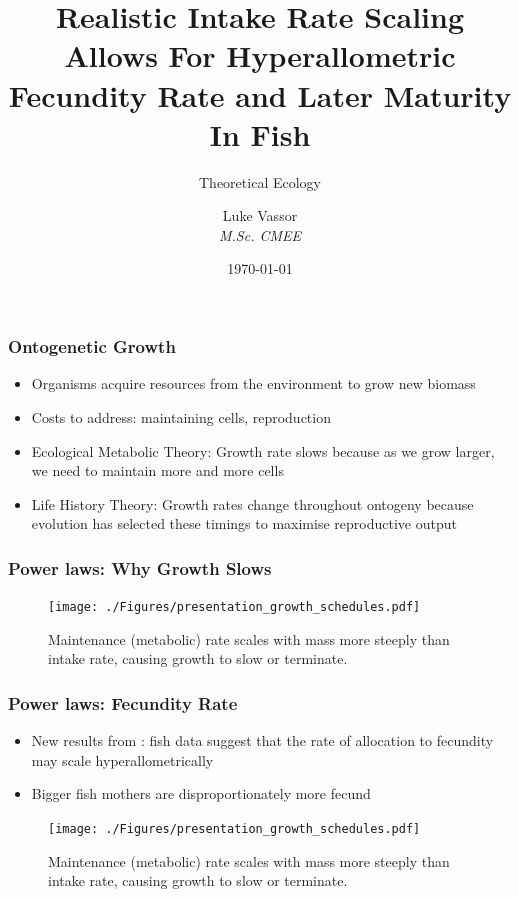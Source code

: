 \documentclass[handout]{beamer}
\institute{\texttt{[image: logo.png]}}
\title{Realistic Intake Rate Scaling Allows For Hyperallometric Fecundity Rate and Later Maturity In Fish}
\subtitle{Theoretical Ecology}
\author{Luke Vassor \\ \textit{M.Sc. CMEE}}
\date{\today}
\begin{document}
 
\frame{\titlepage}


\begin{frame}
	\frametitle{Ontogenetic Growth}
	\begin{itemize}
		\item Organisms acquire resources from the environment to grow new biomass
		\item Costs to address: maintaining cells, reproduction
		\item Ecological Metabolic Theory: Growth rate slows because as we grow larger, we need to maintain more and more cells
		\item Life History Theory: Growth rates change throughout ontogeny because evolution has selected these timings to maximise reproductive output
	\end{itemize}

			
\end{frame}


\begin{frame}
	\frametitle{Power laws: Why Growth Slows}
		\centering
		\begin{figure}
			\texttt{[image: ./Figures/presentation\_growth\_schedules.pdf]} \
			\caption{Maintenance (metabolic) rate scales with mass more steeply than intake rate, causing growth to slow or terminate.}
		\end{figure}
\end{frame}

\begin{frame}
	\frametitle{Power laws: Fecundity Rate}
	\begin{itemize}
		\item New results from \textcite{Barneche2018-reproductive_output}: fish data suggest that the rate of allocation to fecundity may scale hyperallometrically
		\item Bigger fish mothers are disproportionately more fecund
	\end{itemize}
		\centering
		\begin{figure}
			\texttt{[image: ./Figures/presentation\_growth\_schedules.pdf]} \
			\caption{Maintenance (metabolic) rate scales with mass more steeply than intake rate, causing growth to slow or terminate.}
		\end{figure}
\end{frame}
\end{document}
